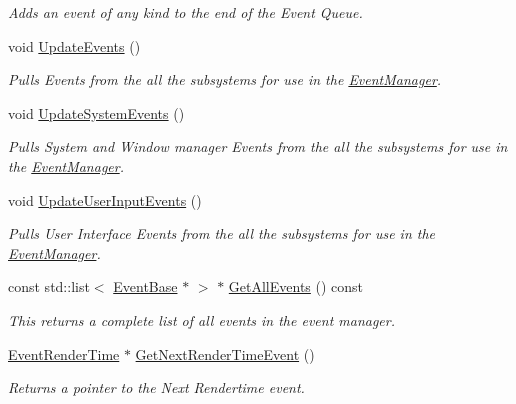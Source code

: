 \begin{DoxyCompactItemize}
\begin{DoxyCompactList}\small\item\em Adds an event of any kind to the end of the Event Queue. \item\end{DoxyCompactList}\item 
void \hyperlink{classphys_1_1EventManager_a63cf23dc9fe0ced3e2c60ca61c97b166}{UpdateEvents} ()
\begin{DoxyCompactList}\small\item\em Pulls Events from the all the subsystems for use in the \hyperlink{classphys_1_1EventManager}{EventManager}. \item\end{DoxyCompactList}\item 
void \hyperlink{classphys_1_1EventManager_a0cf574c55def063d66d7db46a4d3e8a5}{UpdateSystemEvents} ()
\begin{DoxyCompactList}\small\item\em Pulls System and Window manager Events from the all the subsystems for use in the \hyperlink{classphys_1_1EventManager}{EventManager}. \item\end{DoxyCompactList}\item 
void \hyperlink{classphys_1_1EventManager_a01a5a131ac26679eee5dcf5dd514045c}{UpdateUserInputEvents} ()
\begin{DoxyCompactList}\small\item\em Pulls User Interface Events from the all the subsystems for use in the \hyperlink{classphys_1_1EventManager}{EventManager}. \item\end{DoxyCompactList}\item 
const std::list$<$ \hyperlink{classphys_1_1EventBase}{EventBase} $\ast$ $>$ $\ast$ \hyperlink{classphys_1_1EventManager_a1c17bf26ec80f2be30cdb090534cacf8}{GetAllEvents} () const 
\begin{DoxyCompactList}\small\item\em This returns a complete list of all events in the event manager. \item\end{DoxyCompactList}\item 
\hyperlink{classphys_1_1EventRenderTime}{EventRenderTime} $\ast$ \hyperlink{classphys_1_1EventManager_ae8730b039a280449af052d75f2e60b06}{GetNextRenderTimeEvent} ()
\begin{DoxyCompactList}\small\item\em Returns a pointer to the Next Rendertime event. \item\end{DoxyCompactList}\item 

\end{DoxyCompactItemize}
